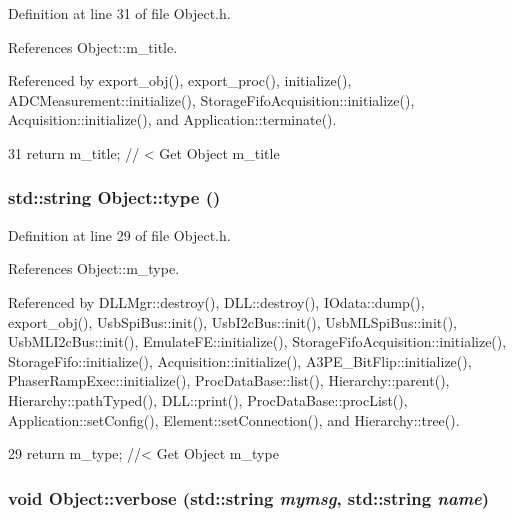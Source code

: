 Definition at line 31 of file Object.h.

References Object::m\_\-title.

Referenced by export\_\-obj(), export\_\-proc(), initialize(), ADCMeasurement::initialize(), StorageFifoAcquisition::initialize(), Acquisition::initialize(), and Application::terminate().


\begin{DoxyCode}
31 { return m_title;      } // < Get Object m_title
\end{DoxyCode}
\hypertarget{classObject_a84f99f70f144a83e1582d1d0f84e4e62}{
\subsubsection[{type}]{\setlength{\rightskip}{0pt plus 5cm}std::string Object::type ()}}
\label{classObject_a84f99f70f144a83e1582d1d0f84e4e62}


Definition at line 29 of file Object.h.

References Object::m\_\-type.

Referenced by DLLMgr::destroy(), DLL::destroy(), IOdata::dump(), export\_\-obj(), UsbSpiBus::init(), UsbI2cBus::init(), UsbMLSpiBus::init(), UsbMLI2cBus::init(), EmulateFE::initialize(), StorageFifoAcquisition::initialize(), StorageFifo::initialize(), Acquisition::initialize(), A3PE\_\-BitFlip::initialize(), PhaserRampExec::initialize(), ProcDataBase::list(), Hierarchy::parent(), Hierarchy::pathTyped(), DLL::print(), ProcDataBase::procList(), Application::setConfig(), Element::setConnection(), and Hierarchy::tree().


\begin{DoxyCode}
29 { return m_type;       } //< Get Object m_type
\end{DoxyCode}
\hypertarget{classObject_a2d4120195317e2a3c6532e8bb9f3da68}{
\subsubsection[{verbose}]{\setlength{\rightskip}{0pt plus 5cm}void Object::verbose (std::string {\em mymsg}, \/  std::string {\em name})}}
\label{classObject_a2d4120195317e2a3c6532e8bb9f3da68}


